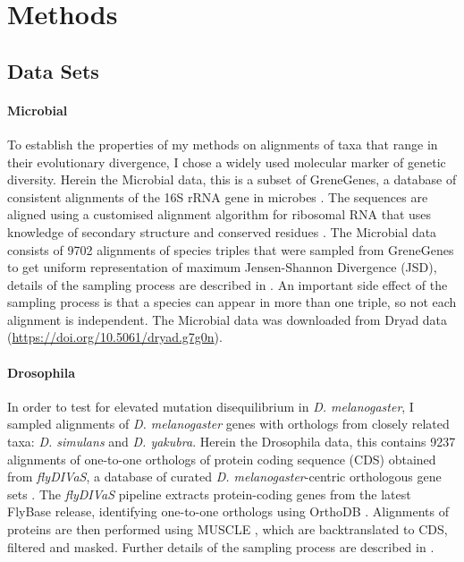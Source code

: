 \chapter{Methods}

\section{Data Sets}

\subsubsection{Microbial}

To establish the properties of my methods on alignments of taxa that range in their evolutionary divergence, I chose a widely used molecular marker of genetic diversity. Herein the Microbial data, this is a subset of GreneGenes, a database of consistent alignments of the 16S rRNA gene in microbes \citep{McDonald2012AnArchaeab}. The sequences are aligned using a customised alignment algorithm for ribosomal RNA that uses knowledge of secondary structure and conserved residues \citep{McDonald2012AnArchaea}. The Microbial data consists of 9702 alignments of species triples that were sampled from GreneGenes to get uniform representation of maximum Jensen-Shannon Divergence (JSD), details of the sampling process are described in \citep{Kaehler2015}. An important side effect of the sampling process is that a species can appear in more than one triple, so not each alignment is independent. The Microbial data was downloaded from Dryad data (\href{https://doi.org/10.5061/dryad.g7g0n}{https://doi.org/10.5061/dryad.g7g0n}).  

\subsubsection{Drosophila}

In order to test for elevated mutation disequilibrium in \textit{D. melanogaster}, I sampled alignments of \textit{D. melanogaster} genes with orthologs from closely related taxa: \textit{D. simulans} and \textit{D. yakubra}. Herein the Drosophila data, this contains 9237 alignments of one-to-one orthologs of protein coding sequence (CDS) obtained from \textit{flyDIVaS}, a database of curated \textit{D. melanogaster}-centric orthologous gene sets \citep{Stanley2016FlyDIVaS:Selection, Clark2007EvolutionPhylogeny}. The \textit{flyDIVaS} pipeline extracts protein-coding genes from the latest FlyBase release, identifying one-to-one orthologs using OrthoDB \citep{Zdobnov2021OrthoDBOrthologs}. Alignments of proteins are then performed using MUSCLE \citep{Edgar2004MUSCLE:Complexity}, which are backtranslated to CDS, filtered and masked. Further details of the sampling process are described in \citep{Stanley2016FlyDIVaS:Selection}. 

